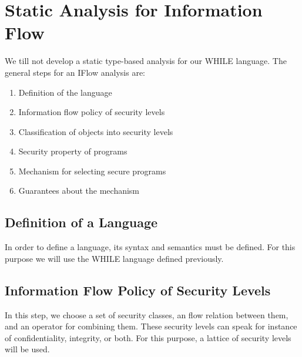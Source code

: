 \documentclass[10pt,a4paper]{report}
\begin{document}
\section{Static Analysis for Information Flow}
We till not develop a static type-based analysis for our WHILE language. The general steps for an IFlow analysis are:
\begin{enumerate}
\item Definition of the language
\item Information flow policy of security levels
\item Classification of objects into security levels
\item Security property of programs
\item Mechanism for selecting secure programs
\item Guarantees about the mechanism
\end{enumerate}
\subsection{Definition of a Language}
In order to define a language, its syntax and semantics must be defined. For this purpose we will use the WHILE language defined previously.
\subsection{Information Flow Policy of Security Levels}
In this step, we choose a set of security classes, an flow relation between them, and an operator for combining them. These security levels can speak for instance of confidentiality, integrity, or both. For this purpose, a lattice of security levels will be used.
\end{document}
